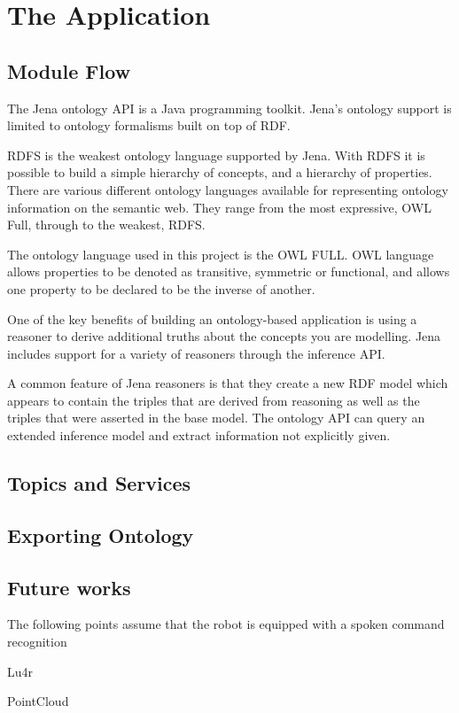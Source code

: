 \section{The Application}

\subsection{Module Flow}
The Jena ontology API is a Java programming toolkit. Jena's ontology support is limited to ontology formalisms built on top of RDF.

RDFS is the weakest ontology language supported by Jena. With RDFS it is possible to build a simple hierarchy of concepts, and a hierarchy of properties. 
There are various different ontology languages available for representing ontology information on the semantic web. They range from the most expressive, OWL Full, through to the weakest, RDFS.

The ontology language used in this project is the OWL FULL. OWL language allows properties to be denoted as transitive, symmetric or functional, and allows one property to be declared to be the inverse of another.

One of the key benefits of building an ontology-based application is using a reasoner to derive additional truths about the concepts you are modelling. Jena includes support for a variety of reasoners through the inference API.

A common feature of Jena reasoners is that they create a new RDF model which appears to contain the triples that are derived from reasoning as well as the triples that were asserted in the base model. The ontology API can query an extended inference model and extract information not explicitly given.

\subsection{Topics and Services}


\subsection{Exporting Ontology}


\subsection{Future works}

The following points assume that the robot is equipped with a spoken command recognition

Lu4r

PointCloud